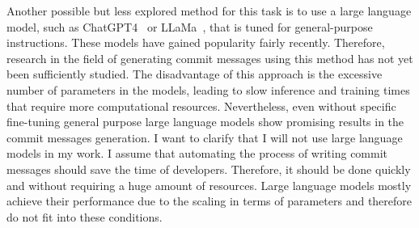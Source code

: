 Another possible but less explored method for this task is to use a large language model, such as ChatGPT4~\cite{achiam2023gpt} or LLaMa~\cite{roziere2023code}, that is tuned for general-purpose instructions. These models have gained popularity fairly recently. Therefore, research in the field of generating commit messages using this method has not yet been sufficiently studied. The disadvantage of this approach is the excessive number of parameters in the models, leading to slow inference and training times that require more computational resources. Nevertheless, even without specific fine-tuning general purpose large language models show promising results in the commit messages generation. I want to clarify that I will not use large language models in my work. I assume that automating the process of writing commit messages should save the time of developers. Therefore, it should be done quickly and without requiring a huge amount of resources.  Large language models mostly achieve their performance due to the scaling in terms of parameters and therefore do not fit into these conditions.  


